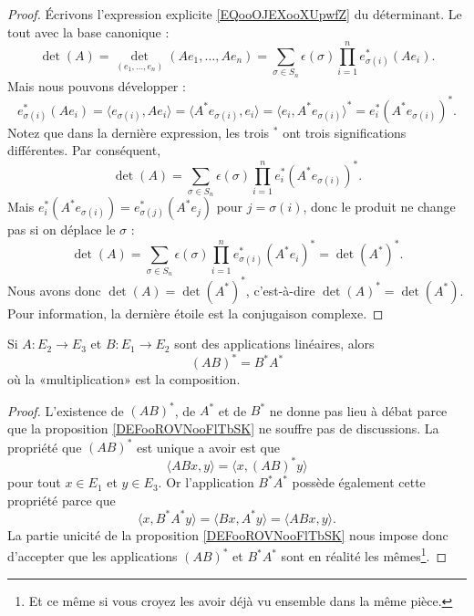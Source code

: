 \begin{proof}
    Écrivons l'expression explicite \eqref{EQooOJEXooXUpwfZ} du déterminant. Le tout avec la base canonique :
    \begin{equation}
            \det(A)=\det_{(e_1,\ldots, e_n)}(Ae_1,\ldots, Ae_n)=\sum_{\sigma\in S_n}\epsilon(\sigma)\prod_{i=1}^ne_{\sigma(i)}^*(Ae_i).
    \end{equation}
    Mais nous pouvons développer :
    \begin{equation}
        e^*_{\sigma(i)}(Ae_i)=\langle e_{\sigma(i)}, Ae_i\rangle =\langle A^*e_{\sigma(i)}, e_i\rangle =\langle e_i, A^*e_{\sigma(i)}\rangle^*=e_i^*(A^*e_{\sigma(i)})^*.
    \end{equation}
    Notez que dans la dernière expression, les trois \( {}^*\) ont trois significations différentes. Par conséquent,
    \begin{equation}
        \det(A)=\sum_{\sigma\in S_n}\epsilon(\sigma)\prod_{i=1}^{n}e_i^*(A^*e_{\sigma(i)})^*.
    \end{equation}
    Mais \( e_i^*(A^*e_{\sigma(i)})=e_{\sigma(j)}^*(A^*e_{j})\) pour \( j=\sigma(i)\), donc le produit ne change pas si on déplace le \( \sigma\) :
    \begin{equation}
        \det(A)=\sum_{\sigma\in S_n}\epsilon(\sigma)\prod_{i=1}^{n}e_{\sigma(i)}^*(A^*e_{i})^*=\det(A^*)^*.
    \end{equation}
    Nous avons donc \( \det(A)=\det(A^*)^*\), c'est-à-dire \( \det(A)^*=\det(A^*)\). Pour information, la dernière étoile est la conjugaison complexe.
\end{proof}

\begin{proposition}     \label{PROPooVPSYooRuoEFi}
    Si \( A\colon E_2\to E_3\) et \( B\colon E_1\to E_2\) sont des applications linéaires, alors
    \begin{equation}
        (AB)^*=B^*A^*
    \end{equation}
    où la «multiplication» est la composition.
\end{proposition}

\begin{proof}
    L'existence de \( (AB)^*\), de \( A^*\) et de \( B^*\) ne donne pas lieu à débat parce que la proposition \ref{DEFooROVNooFlTbSK} ne souffre pas de discussions. La propriété que \( (AB)^*\) est unique a avoir est que
    \begin{equation}
        \langle ABx, y\rangle =\langle x, (AB)^*y\rangle 
    \end{equation}
    pour tout \( x\in E_1\) et \( y\in E_3\). Or l'application \( B^*A^*\) possède également cette propriété parce que
    \begin{equation}
        \langle x, B^*A^*y\rangle =\langle Bx, A^*y\rangle =\langle ABx, y\rangle .
    \end{equation}
    La partie unicité de la proposition \ref{DEFooROVNooFlTbSK} nous impose donc d'accepter que les applications \( (AB)^*\) et \( B^*A^*\) sont en réalité les mêmes\footnote{Et ce même si vous croyez les avoir déjà vu ensemble dans la même pièce.}.
\end{proof}

